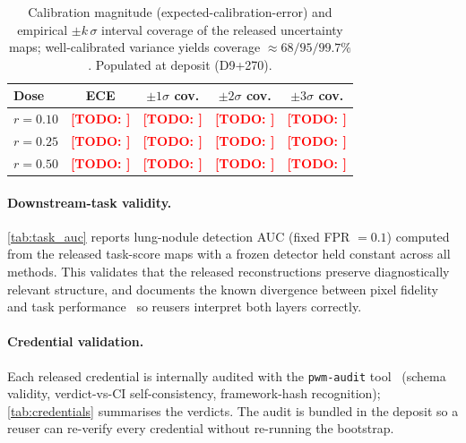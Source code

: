 \documentclass{article}
\newcommand{\todo}[1]{\textcolor{red}{\textbf{[TODO: #1]}}}
\newcommand{\todoTable}[2]{%
  \begin{table}[ht]\centering%
    \fbox{\parbox{0.85\linewidth}{\centering\todo{TABLE: #2}}}%
    \caption{#2 (placeholder; populate when the corpus is deposited).}\label{#1}%
  \end{table}}
\begin{document}
\begin{table}[h]
    \centering
    \small
    \begin{tabular}{lcccc}
        \toprule
        \textbf{Dose} & \textbf{ECE} & \textbf{$\pm1\sigma$ cov.} & \textbf{$\pm2\sigma$ cov.} & \textbf{$\pm3\sigma$ cov.} \\
        \midrule
        $r = 0.10$ & \todo{} & \todo{} & \todo{} & \todo{} \\
        $r = 0.25$ & \todo{} & \todo{} & \todo{} & \todo{} \\
        $r = 0.50$ & \todo{} & \todo{} & \todo{} & \todo{} \\
        \bottomrule
    \end{tabular}
    \caption{Calibration magnitude (expected-calibration-error) and
    empirical $\pm k\,\sigma$ interval coverage of the released uncertainty
    maps; well-calibrated variance yields coverage $\approx 68/95/99.7\%$.
    Populated at deposit (D9+270).}
    \label{tab:uq_coverage}
\end{table}

\paragraph{Downstream-task validity.} \autoref{tab:task_auc} reports
lung-nodule detection AUC (fixed FPR $=0.1$) computed from the released
task-score maps with a frozen detector held constant across all methods.
This validates that the released reconstructions preserve diagnostically
relevant structure, and documents the known divergence between pixel
fidelity and task performance~\citep{kim2019smoothing} so reusers
interpret both layers correctly.

\todoTable{tab:task_auc}{Lung-nodule detection AUC (frozen detector, fixed
FPR $=0.1$) computed from the released task-score maps, per method, per
dose level}

\paragraph{Credential validation.} Each released credential is internally
audited with the \texttt{pwm-audit} tool~\citep{ws2framework}
(schema validity, verdict-vs-CI self-consistency, framework-hash
recognition); \autoref{tab:credentials} summarises the verdicts. The
audit is bundled in the deposit so a reuser can re-verify every credential
without re-running the bootstrap.
\end{document}

